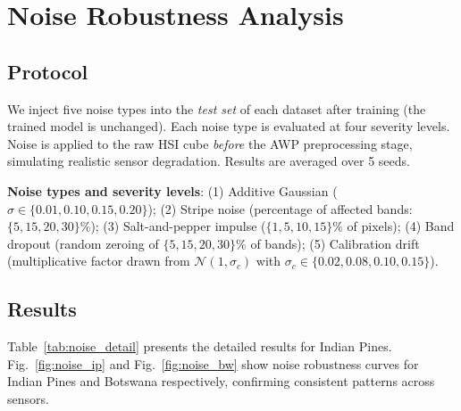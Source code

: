 \documentclass[conference]{IEEEtran}
\begin{document}
{{%
\section{Noise Robustness Analysis}

\subsection{Protocol}

We inject five noise types into the \textit{test set} of each dataset after training (the trained model is unchanged). Each noise type is evaluated at four severity levels. Noise is applied to the raw HSI cube \textit{before} the AWP preprocessing stage, simulating realistic sensor degradation. Results are averaged over 5 seeds.

\textbf{Noise types and severity levels}: (1) Additive Gaussian ($\sigma \in \{0.01, 0.10, 0.15, 0.20\}$); (2) Stripe noise (percentage of affected bands: $\{5, 15, 20, 30\}\%$); (3) Salt-and-pepper impulse ($\{1, 5, 10, 15\}\%$ of pixels); (4) Band dropout (random zeroing of $\{5, 15, 20, 30\}\%$ of bands); (5) Calibration drift (multiplicative factor drawn from $\mathcal{N}(1, \sigma_c)$ with $\sigma_c \in \{0.02, 0.08, 0.10, 0.15\}$).

\subsection{Results}

Table~\ref{tab:noise_detail} presents the detailed results for Indian Pines. Fig.~\ref{fig:noise_ip} and Fig.~\ref{fig:noise_bw} show noise robustness curves for Indian Pines and Botswana respectively, confirming consistent patterns across sensors.

}}
\end{document}
